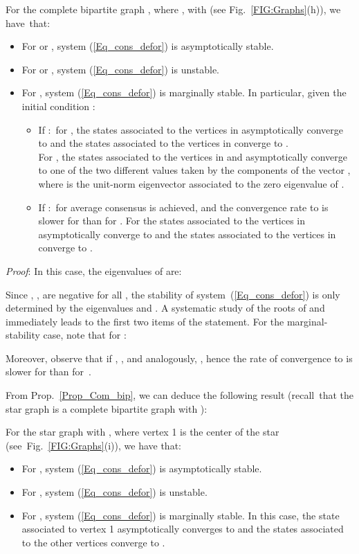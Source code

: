 \documentclass[letterpaper,9pt,twocolumn]{autart}
\begin{document}
\begin{proposition}\label{Prop_Com_bip}
For the complete bipartite graph ,
where \mbox{},  with  
(see Fig.~\ref{FIG:Graphs}(h)), we have~that:
\begin{itemize}
\item For  or , system (\ref{Eq_cons_defor}) is asymptotically stable.
\item For  or , system (\ref{Eq_cons_defor}) is unstable.
\item For ,
system (\ref{Eq_cons_defor}) is marginally stable.
In particular, given the initial condition \mbox{}:
\begin{itemize}
\item If :\, for , the states associated to the vertices in  asymptotically converge to
 and
the states associated to the vertices in  converge to .\\
For , the states associated to the vertices
in  and  asymptotically converge to one of the two different
values taken by the components of the vector , where 
 is the unit-norm eigenvector associated to the zero
eigenvalue of .
\item If :\, for  average consensus is achieved, and the convergence rate to
 is slower for  than for \mbox{}.
For \mbox{} the states
associated to the vertices in  asymptotically converge to 
 and the states associated to the vertices in 
converge to .
\end{itemize}
\end{itemize}
\emph{Proof}:
In this case, the eigenvalues of  are: 


Since , ,  are negative for
all , the stability of system~(\ref{Eq_cons_defor}) is only
determined by the eigenvalues  and .
A systematic study of the roots of  and
 immediately leads to the first two items of the
statement. For the marginal-stability case, note that for :\vspace{-0.2cm}

Moreover, observe that if , , and analogously,
, 
hence the rate of convergence to  is slower
for  than for~.~\hfill
\end{proposition}
From Prop.~\ref{Prop_Com_bip}, we can deduce the following result (recall~that the star graph is a complete bipartite graph with ):

\begin{proposition}
For the star graph  with , where vertex 1 is the
center of the star (see~Fig.~\ref{FIG:Graphs}(i)), we have that:
\begin{itemize}
\item For , system (\ref{Eq_cons_defor}) is asymptotically stable.
\item For , system (\ref{Eq_cons_defor}) is unstable.
\item For , system (\ref{Eq_cons_defor}) is marginally stable.
In this case, the state associated to vertex 1 asymptotically converges
to 
and the states associated to the other  vertices converge to .~\hfill\vspace{0.05cm}
\end{itemize}
\end{proposition}
\end{document}
